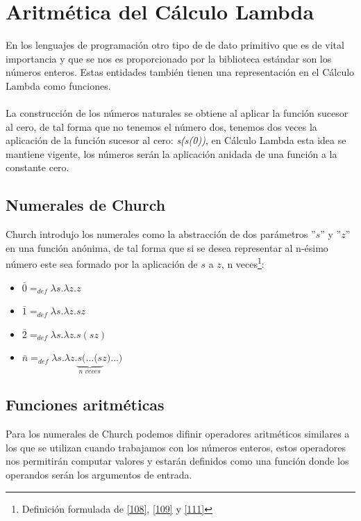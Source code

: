      \section{Aritmética del Cálculo Lambda}
        En los lenguajes de programación otro tipo de de dato primitivo que es de vital importancia y que se nos es proporcionado por la biblioteca estándar son los números enteros.
        Estas entidades también tienen una representación en el Cálculo Lambda como funciones.\\\\
        La construcción de los números naturales se obtiene al aplicar la función sucesor al cero, de tal forma que no tenemos el número dos, tenemos dos veces la aplicación de la función sucesor al cero: \textit{s(s(0))}, en Cálculo Lambda esta idea se mantiene vigente, los números serán la aplicación anidada de una función a la constante cero. 
     \subsection{Numerales de Church}
        Church introdujo los numerales como la abstracción de dos parámetros ''$s$'' y ''$z$'' en una función anónima, de tal forma que si se desea representar al n-ésimo número este sea formado por la aplicación de $s$ a $z$, n veces\footnote{Definición formulada de \hyperlink{108}{[108]},  \hyperlink{109}{[109]} y  \hyperlink{111}{[111]}}:

    \begin{itemize}
        \item $\bar{0}=_{def}\lambda s.\lambda z.z$
        \item $\bar{1}=_{def}\lambda s.\lambda z.sz$
        \item $\bar{2}=_{def}\lambda s.\lambda z.s(sz)$
        \item $\bar{n}=_{def}\lambda s.\lambda z.\underbrace{s(\ldots(s}_{n\;veces} z)\ldots)$
    \end{itemize}

    \subsection{Funciones aritméticas}
		Para los numerales de Church podemos difinir operadores aritméticos similares a los que se utilizan cuando trabajamos con los números enteros, estos operadores nos permitirán computar valores y estarán definidos como una función donde los operandos serán los argumentos de entrada.

